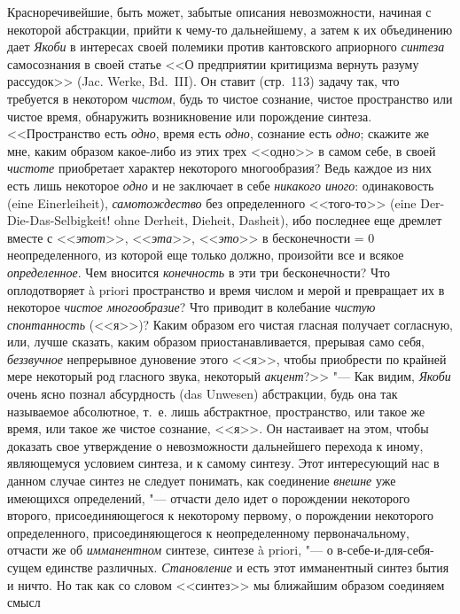 Красноречивейшие, быть может, забытые описания невозможности, начиная с
некоторой абстракции, прийти к чему-то дальнейшему, а затем к их
объединению дает {\em Якоби} в интересах своей полемики
против кантовского априорного {\em синтеза}
самосознания в своей статье <<О предприятии критицизма вернуть разуму
рассудок>> (Jac. Werke, Bd.~III). Он ставит (стр.~113) задачу так, что
требуется в некотором {\em чистом}, будь то чистое
сознание, чистое пространство или чистое время, обнаружить возникновение
или порождение синтеза. <<Пространство есть {\em одно},
время есть {\em одно}, сознание есть
{\em одно}; скажите же мне, каким образом какое-либо из
этих трех <<одно>> в самом себе, в своей {\em чистоте}
приобретает характер некоторого многообразия? Ведь каждое из них есть лишь
некоторое {\em одно} и не заключает в себе
{\em никакого иного}: одинаковость (eine
Einerleiheit), {\em самотождество} без определенного
<<того-то>> (eine Der-Die-Das-Selbigkeit! ohne Derheit, Dieheit, Dasheit),
ибо последнее еще дремлет вместе с <<{\em этот}>>,
<<{\em эта}>>, <<{\em это}>> в
бесконечности = 0 неопределенного, из которой еще только должно, произойти
все и всякое {\em определенное}. Чем вносится
{\em конечность} в эти три бесконечности? Что
оплодотворяет à priori пространство и время числом и мерой и превращает их
в некоторое {\em чистое многообразие}? Что приводит в
колебание {\em чистую спонтанность} (<<я>>)? Каким
образом его чистая гласная получает согласную, или, лучше сказать, каким
образом приостанавливается, прерывая само себя,
{\em беззвучное} непрерывное дуновение этого <<я>>, чтобы
приобрести по крайней мере некоторый род гласного звука, некоторый
{\em акцент}?>> "--- Как видим,
{\em Якоби} очень ясно познал абсурдность (das Unwesen)
абстракции, будь она так называемое абсолютное, т.~е. лишь абстрактное,
пространство, или такое же время, или такое же чистое сознание, <<я>>. Он
настаивает на этом, чтобы доказать свое утверждение о невозможности
дальнейшего перехода к иному, являющемуся условием синтеза, и к самому
синтезу. Этот интересующий нас в данном случае синтез не следует понимать,
как соединение {\em внешне} уже имеющихся определений,
"--- отчасти дело идет о порождении некоторого второго, присоединяющегося к
некоторому первому, о порождении некоторого определенного,
присоединяющегося к неопределенному первоначальному, отчасти же об
{\em имманентном} синтезе, синтезе à priori, "--- о
в-себе-и-для-себя-сущем единстве различных.
{\em Становление} и есть этот имманентный синтез бытия
и ничто. Но так как со словом <<синтез>> мы ближайшим образом соединяем смысл
